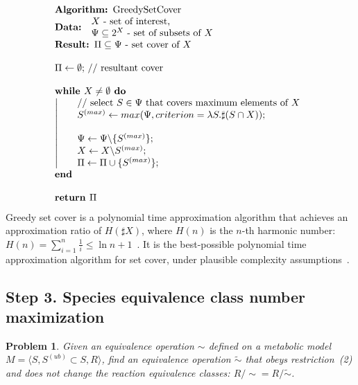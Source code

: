 \documentclass[9pt]{article}
\newcounter{pbm}
\newcounter{def}
\newcounter{rm}
\begin{document}
\[ \begin{array}{l}
\mbox{\textbf{Algorithm: }GreedySetCover}\\
\mbox{\textbf{Data: }}\begin{array}{l}\mbox{$X$ - set of interest,}\\ \mbox{$\Psi \subseteq 2^X$ - set of subsets of $X$}\end{array}\\
\mbox{\textbf{Result: }$\Pi \subseteq \Psi$ - set cover of $X$}\\
\mbox{~}\\
\mbox{$\Pi \leftarrow \emptyset;$ // resultant cover}\\
\mbox{~}\\
\mbox{\textbf{while }$X \neq \emptyset$\textbf{ do}}\\
\left| \indent \begin{array}{l}
\mbox{// select $S \in \Psi$ that covers maximum elements of $X$} \\
\mbox{$S^{(max)} \leftarrow max(\Psi, criterion=\lambda{S}.\sharp{(S\cap{X}}));$} \\
\mbox{~}\\
\mbox{$\Psi \leftarrow \Psi\backslash\{S^{(max)}\};$}\\
\mbox{$X \leftarrow X\backslash{S^{(max)}};$} \\
\mbox{$\Pi \leftarrow \Pi\cup\{S^{(max)}\};$} 
\end{array}\right.\\
\mbox{\textbf{end}}\\
\mbox{~}\\
\mbox{\textbf{return }$\Pi$}
\end{array} \]
Greedy set cover is a polynomial time approximation algorithm that achieves an approximation ratio of $H(\sharp X)$, where $H(n)$ is the $n$-th harmonic number: $H(n) = \sum^n_{i = 1}\frac{1}{i} \leq \ln{n} + 1$~\citep{Chvatal1979}. It is the best-possible polynomial time approximation algorithm for set cover, under plausible complexity assumptions~\citep{Feige1998}. 

\subsection*{Step 3. Species equivalence class number maximization}
\newtheorem{p1}[pbm]{Problem}
\begin{p1}
Given an equivalence operation $\sim$ defined on a metabolic model $M=\langle S, S^{(ub)}\subset{S}, R \rangle$, find an equivalence operation $\tilde{\sim}$ that obeys restriction~(2) and does not change the reaction equivalence classes: $R/\sim = R/\tilde{\sim}$. 
\end{p1}
\end{document}
